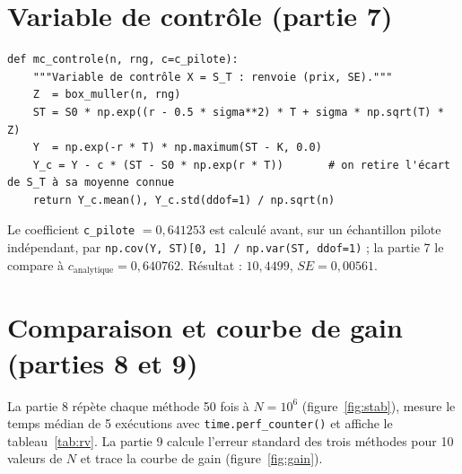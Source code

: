 \section*{Variable de contrôle (partie 7)}
\begin{lstlisting}
def mc_controle(n, rng, c=c_pilote):
    """Variable de contrôle X = S_T : renvoie (prix, SE)."""
    Z  = box_muller(n, rng)
    ST = S0 * np.exp((r - 0.5 * sigma**2) * T + sigma * np.sqrt(T) * Z)
    Y  = np.exp(-r * T) * np.maximum(ST - K, 0.0)
    Y_c = Y - c * (ST - S0 * np.exp(r * T))       # on retire l'écart de S_T à sa moyenne connue
    return Y_c.mean(), Y_c.std(ddof=1) / np.sqrt(n)
\end{lstlisting}
Le coefficient \texttt{c\_pilote} $= 0{,}641253$ est calculé avant, sur un échantillon pilote indépendant, par \texttt{np.cov(Y, ST)[0, 1] / np.var(ST, ddof=1)} ; la partie 7 le compare à $c_{\text{analytique}} = 0{,}640762$. Résultat : $10{,}4499$, $SE = 0{,}00561$.

\section*{Comparaison et courbe de gain (parties 8 et 9)}
La partie 8 répète chaque méthode 50 fois à $N = 10^6$ (figure~\ref{fig:stab}), mesure le temps médian de 5 exécutions avec \texttt{time.perf\_counter()} et affiche le tableau~\ref{tab:rv}. La partie 9 calcule l'erreur standard des trois méthodes pour 10 valeurs de $N$ et trace la courbe de gain (figure~\ref{fig:gain}).

